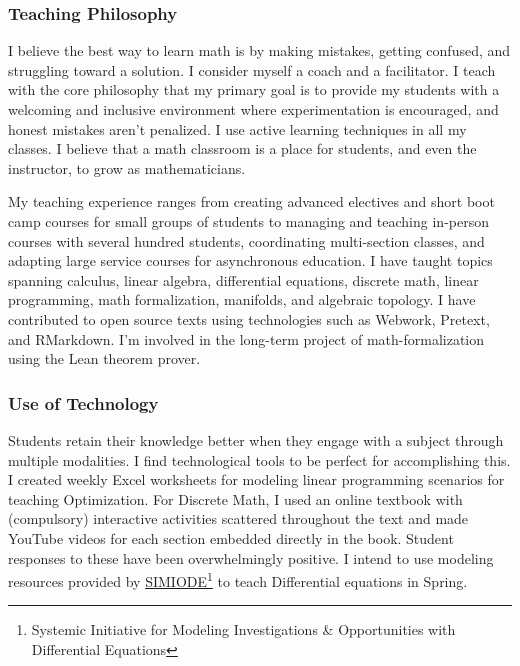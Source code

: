 \documentclass[
]{report}
\begin{document}
\hypertarget{teaching-philosophy}{%
\subsubsection*{Teaching Philosophy}\label{teaching-philosophy}}


I believe the best way to learn math is by making mistakes, getting confused, and struggling toward a solution. I consider myself a coach and a facilitator. I teach with the core philosophy that my primary goal is to provide my students with a welcoming and inclusive environment where experimentation is encouraged, and honest mistakes aren't penalized. I use active learning techniques in all my classes. I believe that a math classroom is a place for students, and even the instructor, to grow as mathematicians.

My teaching experience ranges from creating advanced electives and short boot camp courses for small groups of students to managing and teaching in-person courses with several hundred students, coordinating multi-section classes, and adapting large service courses for asynchronous education. I have taught topics spanning calculus, linear algebra, differential equations, discrete math, linear programming, math formalization, manifolds, and algebraic topology. I have contributed to open source texts using technologies such as Webwork, Pretext, and RMarkdown. I'm involved in the long-term project of math-formalization using the Lean theorem prover.

\hypertarget{use-of-technology}{%
\subsubsection*{Use of Technology}\label{use-of-technology}}


Students retain their knowledge better when they engage with a subject through multiple modalities. I find technological tools to be perfect for accomplishing this. I created weekly Excel worksheets for modeling linear programming scenarios for teaching Optimization. For Discrete Math, I used an online textbook with (compulsory) interactive activities scattered throughout the text and made YouTube videos for each section embedded directly in the book. Student responses to these have been overwhelmingly positive.
I intend to use modeling resources provided by \href{https://qubeshub.org/community/groups/simiode}{SIMIODE}\footnote{Systemic Initiative for Modeling Investigations \& Opportunities with Differential Equations} to teach Differential equations in Spring.
\end{document}
